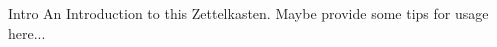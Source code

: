 \documentclass[class=article, crop=false]{standalone}
\begin{document}
\begin{zettel}{Intro}
    An Introduction to this Zettelkasten. Maybe provide some tips for usage here...
\end{zettel}
\end{document}
